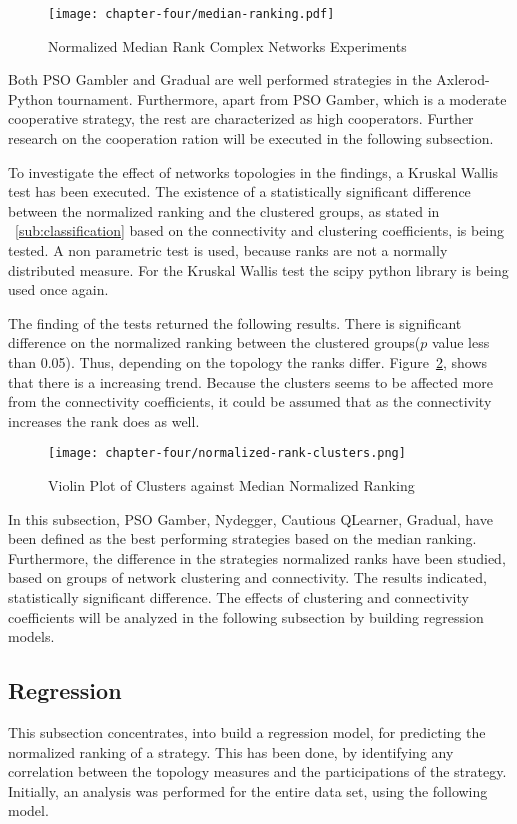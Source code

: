 \begin{figure}[!hbtp]
	\texttt{[image: chapter-four/median-ranking.pdf]}
	\caption{Normalized Median Rank Complex Networks Experiments}
	\label{ranking-second-gen}
\end{figure}

Both PSO Gambler and Gradual are well performed strategies in the Axlerod-Python
tournament. Furthermore, apart from PSO Gamber, which is a moderate cooperative
strategy, the rest are characterized as high cooperators. Further research on
the cooperation ration will be executed in the following subsection.

To investigate the effect of networks topologies in the findings, a Kruskal Wallis test
has been executed. The existence of a statistically significant difference between
the normalized ranking and the clustered groups, as stated in ~\autoref{sub:classification} based on the
connectivity and clustering coefficients, is being tested. A non parametric test
is used, because ranks are not a normally distributed measure. For the Kruskal Wallis
test the scipy python library is being used once again.

The finding of the tests returned the following results. There is significant
difference on the normalized ranking between the clustered groups(\(p\)
value less than 0.05). Thus, depending on the topology the ranks differ.
Figure~\ref{fig:variation-clusters}, shows that there is a increasing trend.
Because the clusters seems to be affected more from the connectivity coefficients,
it could be assumed that as the connectivity increases the rank does as well.

\begin{figure}[!hbtp]
	\texttt{[image: chapter-four/normalized-rank-clusters.png]}
	\caption{Violin Plot of Clusters against Median Normalized Ranking}
	\label{fig:variation-clusters}
\end{figure}

In this subsection, PSO Gamber, Nydegger, Cautious QLearner, Gradual, have been
defined as the best performing strategies based on the median ranking.
Furthermore, the difference in the strategies normalized ranks have been studied,
based on groups of network clustering and connectivity. The results indicated,
statistically significant difference. The effects of clustering and connectivity
coefficients will be analyzed in the following subsection by building regression
models.

\subsection{Regression}
This subsection concentrates, into build a regression model, for predicting
the normalized ranking of a strategy. This has been done, by identifying any
correlation between the topology measures and the participations of the strategy.
Initially, an analysis was performed for the entire data set, using the following
model.

